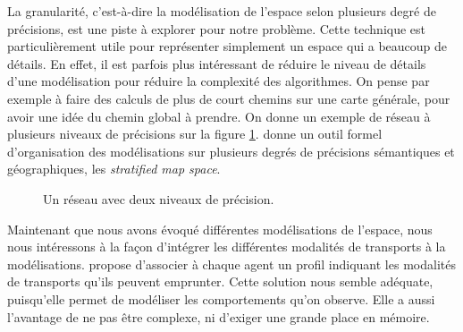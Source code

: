 \documentclass[a4paper]{article}
\begin{document}
La granularité, c'est-à-dire la modélisation de l'espace selon plusieurs degré
de précisions, est une piste à explorer pour notre problème. Cette technique est
particulièrement utile pour représenter simplement un espace qui a beaucoup de
détails. En effet, il est parfois plus intéressant de  réduire le niveau de
détails d'une modélisation pour réduire la complexité des algorithmes. On pense
par exemple à faire des calculs de plus de court chemins sur une carte générale,
pour avoir une idée du chemin global à prendre. On donne un exemple de réseau à
plusieurs niveaux de précisions sur la figure \ref{fig:generalisation}.
\cite{stell1998} donne un outil formel d'organisation des modélisations sur
plusieurs degrés de précisions sémantiques et géographiques, les
\emph{stratified map space}.

\begin{figure}
  \caption{Un réseau avec deux niveaux de précision.}
  \label{fig:generalisation}
\end{figure}

Maintenant que nous avons évoqué différentes modélisations de l'espace, nous
nous intéressons à la façon d'intégrer les différentes modalités de transports à
la modélisations. \cite{jguirim2015} propose d'associer à chaque agent un profil
indiquant les modalités de transports qu'ils peuvent emprunter. Cette solution
nous semble adéquate, puisqu'elle permet de modéliser les comportements qu'on
observe. Elle a aussi l'avantage de ne pas être complexe, ni d'exiger une grande
place en mémoire.
\end{document}
